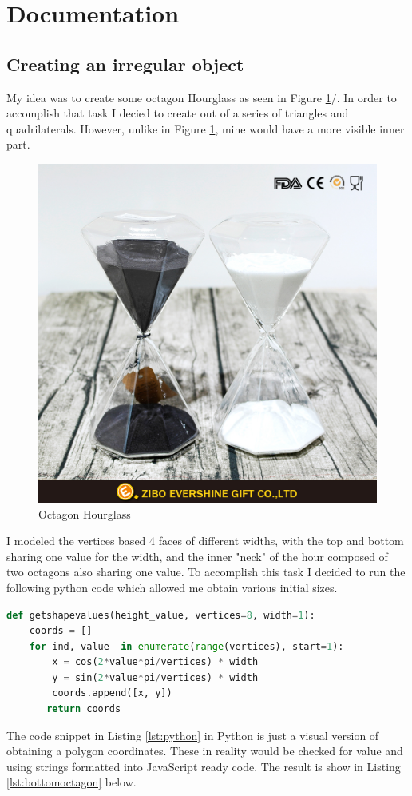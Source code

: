 \documentclass[12pt,a4paper]{article}
\begin{document}
\section{Documentation}
\subsection{Creating an irregular object}
My idea was to create some octagon Hourglass as seen in Figure \ref{img:hourglass}/. In order to accomplish that task I decied to create out of a series of triangles and quadrilaterals. However, unlike in  Figure \ref{img:hourglass}, mine would have a more visible inner part.  

\begin{figure}[htbp]
\begin{center}
\includegraphics[width=0.4\columnwidth, angle = 0]{img/hourglass.png}
\end{center}
\caption{Octagon Hourglass \cite{hourglass}}
\label{img:hourglass}
\end{figure}
I modeled the vertices based 4 faces of different widths, with the top and bottom sharing one value for the width, and the inner "neck" of the hour composed of two octagons also sharing one value. To accomplish this task I decided to run the following python code which allowed me obtain various initial sizes.

\begin{lstlisting}[caption={Getting values for the vertices},label={lst:python},language=python]
def getshapevalues(height_value, vertices=8, width=1):
    coords = []
    for ind, value  in enumerate(range(vertices), start=1):
        x = cos(2*value*pi/vertices) * width
        y = sin(2*value*pi/vertices) * width
        coords.append([x, y])
       return coords
\end{lstlisting}
The  code snippet in Listing \ref{lst:python} in Python is just a visual version of obtaining a polygon coordinates. These in reality would be checked for value and using strings formatted into JavaScript ready code. The result is show in Listing \ref{lst:bottomoctagon} below.
\end{document}
